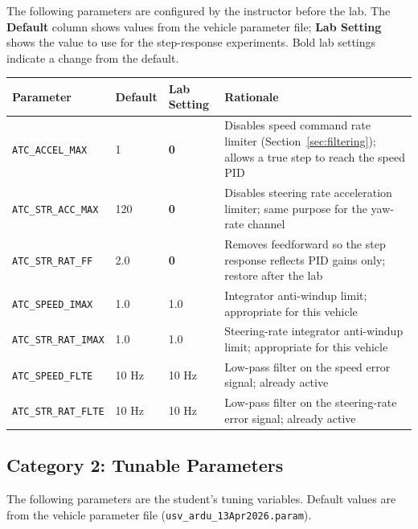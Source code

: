 \documentclass[../../book.tex]{subfiles}
\begin{document}
The following parameters are configured by the instructor before the lab.  The \textbf{Default} column shows values from the vehicle parameter file; \textbf{Lab Setting} shows the value to use for the step-response experiments.  Bold lab settings indicate a change from the default.

\vspace{6pt}
\begin{center}
\begin{tabular}{L{3.6cm} C{1.8cm} C{1.8cm} L{5.8cm}}
  \textbf{Parameter} & \textbf{Default} & \textbf{Lab Setting} & \textbf{Rationale} \\
  \midrule
  \texttt{ATC\_ACCEL\_MAX}     & 1     & \textbf{0} & Disables speed command rate limiter (Section~\ref{sec:filtering}); allows a true step to reach the speed PID \\[6pt]
  \texttt{ATC\_STR\_ACC\_MAX}  & 120   & \textbf{0} & Disables steering rate acceleration limiter; same purpose for the yaw-rate channel \\[6pt]
  \texttt{ATC\_STR\_RAT\_FF}   & 2.0   & \textbf{0} & Removes feedforward so the step response reflects PID gains only; restore after the lab \\[6pt]
  \texttt{ATC\_SPEED\_IMAX}    & 1.0   & 1.0        & Integrator anti-windup limit; appropriate for this vehicle \\[6pt]
  \texttt{ATC\_STR\_RAT\_IMAX} & 1.0   & 1.0        & Steering-rate integrator anti-windup limit; appropriate for this vehicle \\[6pt]
  \texttt{ATC\_SPEED\_FLTE}    & 10 Hz & 10 Hz      & Low-pass filter on the speed error signal; already active \\[6pt]
  \texttt{ATC\_STR\_RAT\_FLTE} & 10 Hz & 10 Hz      & Low-pass filter on the steering-rate error signal; already active \\[4pt]
  \bottomrule
\end{tabular}
\end{center}
\vspace{6pt}

\subsection{Category 2: Tunable Parameters}

The following parameters are the student's tuning variables.  Default values are from the vehicle parameter file (\texttt{usv\_ardu\_13Apr2026.param}).
\end{document}
